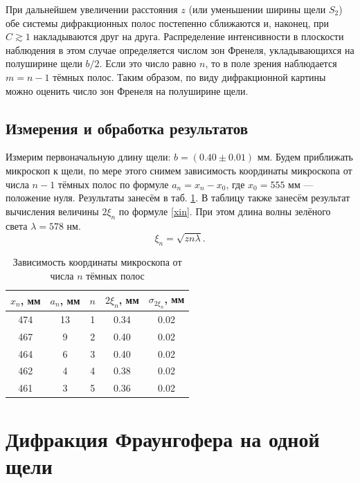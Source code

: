 \documentclass[a4paper,12pt]{article}
\begin{document}
При дальнейшем увеличении расстояния $ z $ (или уменьшении ширины щели $ S_2 $) обе системы дифракционных полос постепенно сближаются и, наконец, при $ C \gtrsim 1 $ накладываются друг на друга. Распределение интенсивности в плоскости наблюдения в этом случае определяется числом зон Френеля, укладывающихся на полуширине щели $ b/2 $. Если это число равно $ n $, то в поле зрения наблюдается $ m = n - 1 $ тёмных полос. Таким образом, по виду дифракционной картины можно оценить число зон Френеля на полуширине щели.

\subsection{Измерения и обработка результатов}

Измерим первоначальную длину щели: $ b = (0.40 \pm 0.01)$ мм. Будем приближать микроскоп к щели, по мере этого снимем зависимость координаты микроскопа от числа $ n - 1 $ тёмных полос по формуле $ a_n = x_n - x_0 $, где $ x_0 = 555 $ мм --- положение нуля. Результаты занесём в таб. \ref{table1}. В таблицу также занесём результат вычисления величины $ 2\xi_n $ по формуле \eqref{xin}. При этом длина волны зелёного света $ \lambda = 578$ нм. 
\begin{equation}
\xi_n = \sqrt{zn\lambda}.
\end{equation}


\begin{table}[H]
	\caption{Зависимость координаты микроскопа от числа $ n $ тёмных полос}
	\label{table1}	
	\begin{center}
		\begin{tabular}{|c|c|c|c|c|}
			\hline
			$ x_n $, мм  & $ a_n $, мм & $ n $& $ 2\xi_n $, мм& $ \sigma_{2\xi_n} $, мм\\
			\hline
			474 &	13	&	1   & 0.34  & 0.02
			\\ \hline
			467	&	9	&	2   & 0.40  & 0.02
			\\ \hline
			464	&	6	&	3   & 0.40  & 0.02
			\\ \hline
			462	& 	4	&	4   & 0.38  & 0.02
			\\ \hline
			461	&	3	&	5   & 0.36  & 0.02	\\
			\hline
		\end{tabular}
	\end{center}

\end{table}

\section{Дифракция Фраунгофера на одной щели}
\end{document}
